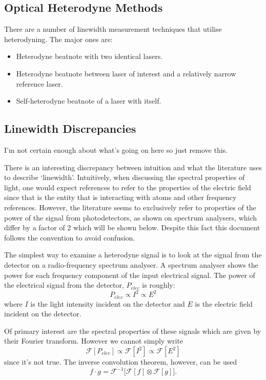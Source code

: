 \subsection{Optical Heterodyne Methods}

There are a number of linewidth measurement techniques that utilise heterodyning. The major ones are:
\begin{itemize}
\item Heterodyne beatnote with two identical lasers.
\item Heterodyne beatnote between laser of interest and a relatively narrow reference laser.
\item Self-heterodyne beatnote of a laser with itself.
\end{itemize}

\subsection{Linewidth Discrepancies}
{\color{red}I'm not certain enough about what's going on here so just remove this.}

There is an interesting discrepancy between intuition and what the literature uses to describe `linewidth'.
Intuitively, when discussing the spectral properties of light, one would expect references to refer to the properties of the electric field since that is the entity that is interacting with atoms and other frequency references.
However, the literature seems to exclusively refer to properties of the power of the signal from photodetectors, as shown on spectrum analysers, which differ by a factor of 2 which will be shown below.
Despite this fact this document follows the convention to avoid confusion.

The simplest way to examine a heterodyne signal is to look at the signal from the detector on a radio-frequency spectrum analyser.
A spectrum analyser shows the power for each frequency component of the input electrical signal.
The power of the electrical signal from the detector, $P_{elec}$ is roughly:
\begin{equation}
P_{elec}\propto I^2 \propto E^2
\label{eq:beatnote_proportional}
\end{equation}
where $I$ is the light intensity incident on the detector and $E$ is the electric field incident on the detector.

Of primary interest are the spectral properties of these signals which are given by their Fourier transform.
However we cannot simply write
\begin{equation}
\mathcal{F}[P_{elec}]\propto \mathcal{F}[I^2] \propto \mathcal{F}[E^2]
\end{equation}
since it's not true.
The inverse convolution theorem, however, can be used
\begin{equation}
f\cdot g = \mathcal{F}^{-1} \bigg[ \mathcal{F}[f] \otimes\mathcal{F}[g]\bigg].
\end{equation}

